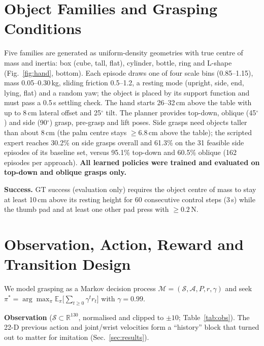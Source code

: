 \documentclass[conference,10pt]{IEEEtran}
\begin{document}
\section{Object Families and Grasping Conditions}\label{sec:objects}
Five families are generated as uniform-density geometries with true centre of mass and inertia: box (cube, tall, flat),
cylinder, bottle, ring and L-shape (Fig.~\ref{fig:hand}, bottom). Each episode draws one of four scale bins (0.85--1.15), mass
0.05--0.30\,kg, sliding friction 0.5--1.2, a resting mode (upright, side, end, lying, flat) and a random yaw; the object is
placed by its support function and must pass a 0.5\,s settling check. The hand starts 26--32\,cm above the table with up to
8\,cm lateral offset and 25$^\circ$ tilt. The planner provides top-down, oblique (45$^\circ$) and side (90$^\circ$) grasp,
pre-grasp and lift poses. Side grasps need objects taller than about 8\,cm (the palm centre stays $\ge6.8$\,cm above the
table); the scripted expert reaches 30.2\% on side grasps overall and 61.3\% on the 31 feasible side episodes of its
baseline set, versus 95.1\% top-down and 60.5\% oblique (162 episodes per approach). \textbf{All learned policies were trained
and evaluated on top-down and oblique grasps only.}

\textbf{Success.} GT success (evaluation only) requires the object centre of mass to stay at least 10\,cm above its resting
height for 60 consecutive control steps (3\,s) while the thumb pad and at least one other pad press with $\ge0.2$\,N.

\section{Observation, Action, Reward and Transition Design}\label{sec:mdp}
We model grasping as a Markov decision process $\mathcal M=(\mathcal S,\mathcal A,P,r,\gamma)$ and seek
$\pi^{*}=\arg\max_\pi \mathbb E_\pi\big[\sum_{t\ge0}\gamma^{t} r_t\big]$ with $\gamma=0.99$.

\textbf{Observation} ($\mathcal S\subset\mathbb R^{130}$, normalised and clipped to $\pm10$; Table~\ref{tab:obs}). The 22-D
previous action and joint/wrist velocities form a ``history'' block that turned out to matter for imitation (Sec.~\ref{sec:results}).
\end{document}
